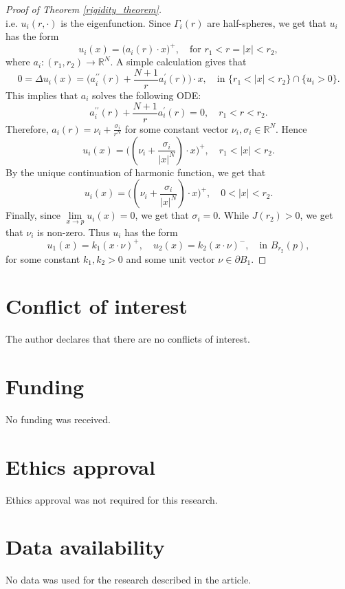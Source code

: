 \documentclass{article}
\theoremstyle{remark}
\numberwithin{equation}{section}
\theoremstyle{definition}
\begin{document}
\begin{proof}[Proof of Theorem \ref{rigidity_theorem}]
\begin{equation}
	\end{equation}
	i.e. $u_{i}(r,\cdot)$ is the eigenfunction. Since $\Gamma_{i}(r)$ are half-spheres, we get that $u_{i}$ has the form
	\begin{equation}
		u_{i}(x) = \big(a_{i}(r)\cdot x\big)^{+},\quad \text{for } r_{1}<r=\lvert x\rvert <r_{2},
	\end{equation}
	where $a_{i} : (r_{1},r_{2}) \to \mathbb{R}^{N}$. A simple calculation gives that
	\begin{equation}
		0=\Delta u_{i}(x) = \big(a_{i}^{\prime\prime}(r)+\frac{N+1}{r}a_{i}^{\prime}(r)\big) \cdot x,\quad \text{in } \{r_{1}<\lvert x\rvert <r_{2}\} \cap \{u_{i}>0\}.
	\end{equation}
	This implies that $a_{i}$ solves the following ODE:
	\begin{equation}
		a_{i}^{\prime\prime}(r) + \frac{N+1}{r} a_{i}^{\prime}(r)=0,\quad r_{1}<r<r_{2}.
	\end{equation}
	Therefore, $a_{i}(r) = \nu_{i} + \frac{\sigma_{i}}{r^{N}}$ for some constant vector $\nu_{i},\sigma_{i} \in \mathbb{R}^{N}$. Hence
	\begin{equation}
		u_{i}(x) = \big((\nu_{i}+\frac{\sigma_{i}}{\lvert x \rvert^{N}}) \cdot x\big)^{+},\quad r_{1}<\lvert x \rvert <r_{2}.
	\end{equation}
	By the unique continuation of harmonic function, we get that
	\begin{equation}
		u_{i}(x) = \big((\nu_{i}+\frac{\sigma_{i}}{\lvert x \rvert^{N}}) \cdot x\big)^{+},\quad 0<\lvert x \rvert <r_{2}.
	\end{equation}
	Finally, since $\lim\limits_{x \to p}u_{i}(x)=0$, we get that $\sigma_{i}=0$. While $J(r_{2})>0$, we get that $\nu_{i}$ is non-zero. Thus $u_{i}$ has the form
	\begin{equation}
		u_{1}(x) = k_{1}(x\cdot \nu)^{+},\quad u_{2}(x) = k_{2}(x\cdot \nu)^{-},\quad \text{in } B_{r_{2}}(p),
	\end{equation}
	for some constant $k_{1},k_{2}>0$ and some unit vector $\nu \in \partial B_{1}$.
\end{proof}

\section*{Conflict of interest}
The author declares that there are no conflicts of interest.

\section*{Funding}
No funding was received.

\section*{Ethics approval}
Ethics approval was not required for this research.

\section*{Data availability}
No data was used for the research described in the article.



\end{document}
